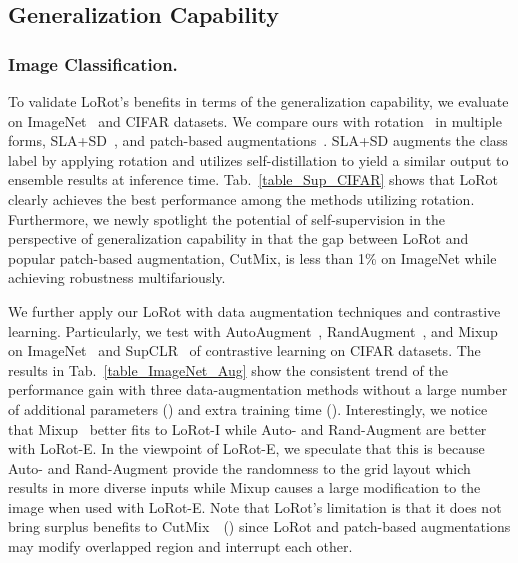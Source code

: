 \subsection{Generalization Capability}
\label{subsection:Classification}
\subsubsection{Image Classification.}
To validate LoRot's benefits in terms of the generalization capability, we evaluate on ImageNet~\cite{deng2009imagenet} and CIFAR datasets.
We compare ours with rotation~\cite{gidaris2018unsupervised} in multiple forms, SLA+SD~\cite{lee2020self}, and patch-based augmentations~\cite{devries2017improved, yun2019cutmix}.
SLA+SD augments the class label by applying rotation and utilizes self-distillation to yield a similar output to ensemble results at inference time.
Tab.~\ref{table_Sup_CIFAR} shows that LoRot clearly achieves the best performance among the methods utilizing rotation. 
Furthermore, we newly spotlight the potential of self-supervision in the perspective of generalization capability in that the gap between LoRot and popular patch-based augmentation, CutMix, is less than 1\% on ImageNet while achieving robustness multifariously.














We further apply our LoRot with data augmentation techniques and contrastive learning. 
Particularly, we test with AutoAugment~\cite{cubuk2019autoaugment}, RandAugment~\cite{cubuk2020randaugment}, and Mixup~\cite{zhang2017mixup} on ImageNet~\cite{deng2009imagenet} and SupCLR~\cite{khosla2020supervised} of contrastive learning on CIFAR datasets. 
The results in Tab.~\ref{table_ImageNet_Aug} show the consistent trend of the performance gain with three data-augmentation methods without a large number of additional parameters () and extra training time ().
Interestingly, we notice that Mixup~\cite{zhang2017mixup} better fits to LoRot-I while Auto- and Rand-Augment are better with LoRot-E.
In the viewpoint of LoRot-E, we speculate that this is because Auto- and Rand-Augment provide the randomness to the grid layout which results in more diverse inputs while Mixup causes a large modification to the image when used with LoRot-E.
Note that LoRot's limitation is that it does not bring surplus benefits to CutMix~\cite{yun2019cutmix}~() since LoRot and patch-based augmentations may modify overlapped region and interrupt each other.


